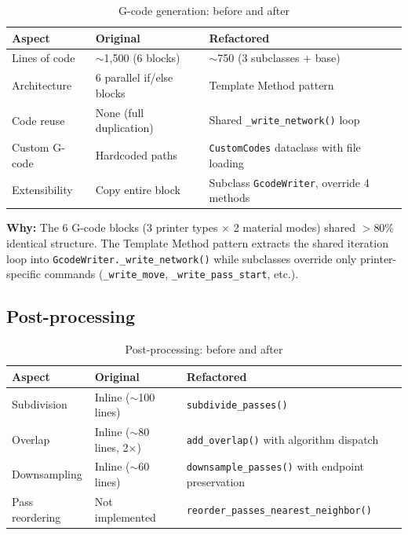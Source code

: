 \documentclass[11pt,a4paper]{article}
\begin{document}
\begin{table}[H]
\centering
\caption{G-code generation: before and after}
\begin{tabularx}{\textwidth}{lXX}
\toprule
\textbf{Aspect} & \textbf{Original} & \textbf{Refactored} \\
\midrule
Lines of code & $\sim$1,500 (6 blocks) & $\sim$750 (3 subclasses + base) \\
Architecture & 6 parallel if/else blocks & Template Method pattern \\
Code reuse & None (full duplication) & Shared \texttt{\_write\_network()} loop \\
Custom G-code & Hardcoded paths & \texttt{CustomCodes} dataclass with file loading \\
Extensibility & Copy entire block & Subclass \texttt{GcodeWriter}, override 4 methods \\
\bottomrule
\end{tabularx}
\end{table}

\textbf{Why:} The 6 G-code blocks (3 printer types $\times$ 2 material modes) shared $>$80\% identical structure. The Template Method pattern extracts the shared iteration loop into \texttt{GcodeWriter.\_write\_network()} while subclasses override only printer-specific commands (\texttt{\_write\_move}, \texttt{\_write\_pass\_start}, etc.).

\subsection{Post-processing}

\begin{table}[H]
\centering
\caption{Post-processing: before and after}
\begin{tabularx}{\textwidth}{lXX}
\toprule
\textbf{Aspect} & \textbf{Original} & \textbf{Refactored} \\
\midrule
Subdivision & Inline ($\sim$100 lines) & \texttt{subdivide\_passes()} \\
Overlap & Inline ($\sim$80 lines, 2$\times$) & \texttt{add\_overlap()} with algorithm dispatch \\
Downsampling & Inline ($\sim$60 lines) & \texttt{downsample\_passes()} with endpoint preservation \\
Pass reordering & Not implemented & \texttt{reorder\_passes\_nearest\_neighbor()} \\
\bottomrule
\end{tabularx}
\end{table}
\end{document}
